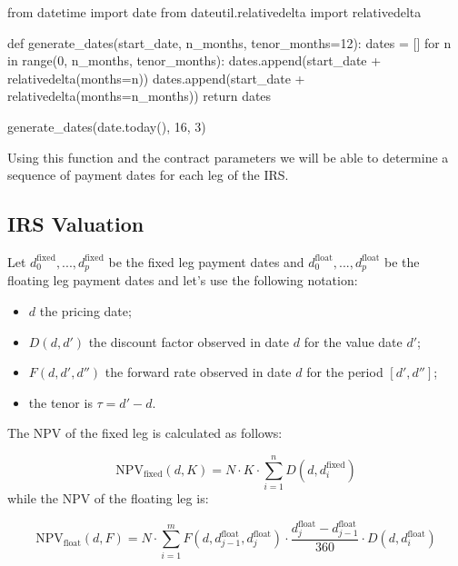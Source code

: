 \begin{ipython}
from datetime import date
from dateutil.relativedelta import relativedelta

def generate_dates(start_date, n_months, tenor_months=12):
    dates = []
    for n in range(0, n_months, tenor_months):
        dates.append(start_date + relativedelta(months=n))
    dates.append(start_date + relativedelta(months=n_months))
    return dates
    
generate_dates(date.today(), 16, 3)
\end{ipython}
\begin{ioutput}
\end{ioutput}
       
Using this function and the contract parameters we will be able to determine a sequence of payment dates for each leg of the IRS.

\subsection{IRS Valuation}
\label{irs-valuation}
Let \(d_0^{\mathrm{fixed}},...,d_p^{\mathrm{fixed}}\) be the fixed leg payment dates and \(d_0^{\mathrm{float}},...,d_p^{\mathrm{float}}\) be the floating leg payment dates and let's use the following notation:

\begin{itemize}
\tightlist
\item
  \(d\) the pricing date;
\item
  \(D(d, d')\) the discount factor observed in date \(d\) for the value date \(d'\);
\item
  \(F(d, d', d'')\) the forward rate observed in date \(d\) for the period \([d', d'']\); 
  \item the tenor is \(\tau = d' - d\).
\end{itemize}
The NPV of the fixed leg is calculated as follows:

\begin{equation}
\mathrm{NPV}_{\mathrm{fixed}}(d, K) = N\cdot K\cdot\sum_{i=1}^{n}D(d, d_{i}^{\mathrm{fixed}})\end{equation}
while the NPV of the floating leg is:

\begin{equation}\mathrm{NPV}_{\mathrm{float}}(d, F) = N\cdot\sum_{i=1}^{m}F(d, d_{j-1}^{\mathrm{float}}, d_{j}^{\mathrm{float}}) \cdot \frac{d_{j}^{\mathrm{float}}-d_{j-1}^{\mathrm{float}}}{360}
\cdot D(d, d_{i}^{\mathrm{float}})\end{equation}

